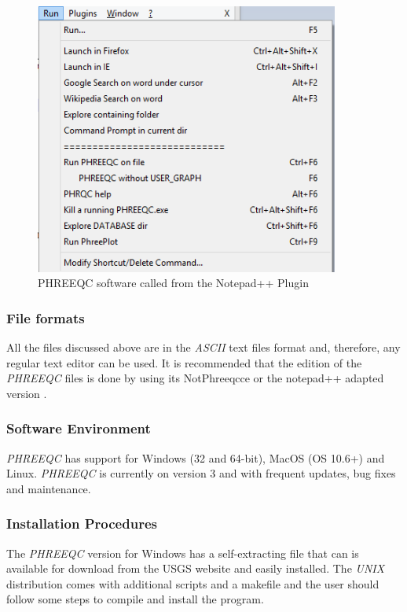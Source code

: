 \documentclass[ppgc,mestrado,English]{iiufrgs}
\begin{document}
\begin{figure}[ht!]
\centering
\includegraphics[width=100mm]{notepad++run_menu.png}
\caption{PHREEQC software called from the Notepad++ Plugin}
\label{fig:phreeqc-notepad++3}
\end{figure}

\subsubsection{File formats}
All the files discussed above are in the \emph{ASCII} text files format and, therefore, any regular text editor can be used. It is recommended that the edition of the \emph{PHREEQC} files is done by using its NotPhreeqcce or the notepad++ adapted version \cite{NotPhree:11}.

\subsubsection{Software Environment}
\emph{PHREEQC} has support for Windows (32 and 64-bit), MacOS (OS 10.6+) and Linux. \emph{PHREEQC} is currently on version 3 and with frequent updates, bug fixes and maintenance.

\subsubsection{Installation Procedures}
The \emph{PHREEQC} version for Windows has a self-extracting file that can is available for download from the USGS website and easily installed. The \emph{UNIX} distribution comes with additional scripts and a makefile and the user should follow some steps to compile and install the program.
\end{document}
